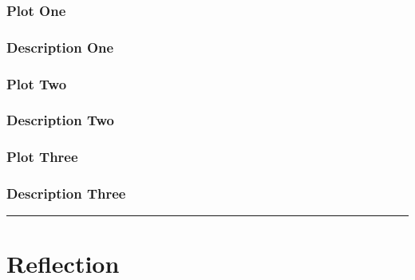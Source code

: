 \documentclass[]{article}
\begin{document}
\subsubsection{Plot One}\label{plot-one}

\subsubsection{Description One}\label{description-one}

\subsubsection{Plot Two}\label{plot-two}

\subsubsection{Description Two}\label{description-two}

\subsubsection{Plot Three}\label{plot-three}

\subsubsection{Description Three}\label{description-three}

\begin{center}\rule{0.5\linewidth}{\linethickness}\end{center}

\section{Reflection}\label{reflection}
\end{document}
